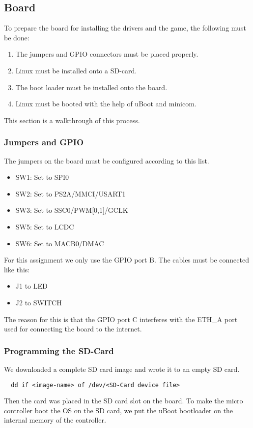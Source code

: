 \subsection{Board}
\label{sec:boardsetup}

To prepare the board for installing the drivers and the game, the following must be done:
\begin{enumerate}
  \item The jumpers and GPIO connectors must be placed properly.
  \item Linux must be installed onto a SD-card.
  \item The boot loader must be installed onto the board.
  \item Linux must be booted with the help of uBoot and minicom.
\end{enumerate}

This section is a walkthrough of this process.

\subsubsection{Jumpers and GPIO}

The jumpers on the board must be configured according to this list.

\begin{itemize}
\item SW1: Set to SPI0
\item SW2: Set to PS2A/MMCI/USART1
\item SW3: Set to SSC0/PWM[0,1]/GCLK
\item SW5: Set to LCDC
\item SW6: Set to MACB0/DMAC
\end{itemize}

For this assignment we only use the GPIO port B. The cables must be connected like this:
\begin{itemize}
  \item J1 to LED
  \item J2 to SWITCH
\end{itemize}
The reason for this is that the GPIO port C interferes with the ETH\_A port used for connecting the board to
the internet.

\subsubsection{Programming the SD-Card}
We downloaded a complete SD card image and wrote it to an empty SD card.
\begin{verbatim}
  dd if <image-name> of /dev/<SD-Card device file>
\end{verbatim}
Then the card was placed in the SD card slot on the board. To make the micro controller boot
the OS on the SD card, we put the uBoot bootloader on the internal memory of the controller.

